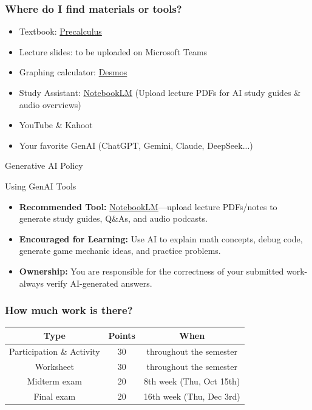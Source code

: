 \begin{frame}
\frametitle{Where do I find materials or tools?}
\begin{itemize}
\item Textbook: \href{https://openstax.org/details/books/precalculus}{Precalculus}
\item Lecture slides: to be uploaded on Microsoft Teams
\item Graphing calculator: \href{https://www.desmos.com/}{Desmos}
\item Study Assistant: \href{https://notebooklm.google.com/}{NotebookLM} (Upload lecture PDFs for AI study guides \& audio overviews)
\item YouTube \& Kahoot
\item Your favorite GenAI (ChatGPT, Gemini, Claude, DeepSeek...)
\end{itemize}
\end{frame}

\begin{frame}{Generative AI Policy}
\begin{block}{Using GenAI Tools}
\begin{itemize}
\item \textbf{Recommended Tool:} \href{https://notebooklm.google.com/}{NotebookLM}—upload lecture PDFs/notes to generate study guides, Q\&As, and audio podcasts.
\item \textbf{Encouraged for Learning:} Use AI to explain math concepts, debug code, generate game mechanic ideas, and practice problems.
\item \textbf{Ownership:} You are responsible for the correctness of your submitted work-always verify AI-generated answers.
\end{itemize}
\end{block}
\end{frame}

\begin{frame}
\frametitle{How much work is there?}

\begin{table}
\centering
\begin{tabular}{|c|c|c|}
\hline
Type & Points & When \\
\hline \hline
Participation \& Activity & 30 & throughout the semester  \\
\hline
Worksheet & 30 & throughout the semester  \\
\hline
Midterm exam & 20 & 8th week (Thu, Oct 15th)  \\
\hline
Final exam & 20 & 16th week (Thu, Dec 3rd)  \\
\hline
\end{tabular}
\end{table}
\end{frame}


